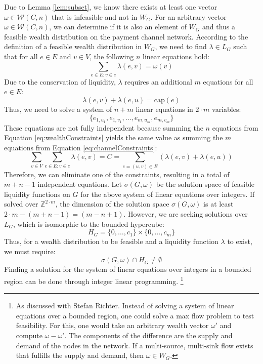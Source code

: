 \documentclass[10pt,twocolumn]{article}
\begin{document}
Due to Lemma \ref{lem:subset}, we know there exists at least one vector \( \omega \in \mathcal{W}(C,n) \) that is infeasible and not in \( W_G \).  
For an arbitrary vector \( \omega \in \mathcal{W}(C,n) \), we can determine if it is also an element of \( W_G \) and thus a feasible wealth distribution on the payment channel network.  
According to the definition of a feasible wealth distribution in \( W_G \), we need to find \( \lambda \in L_G \) such that for all \( e \in E \) and \( v \in V \), the following \( n \) linear equations hold:  
\begin{equation}
  \label{eq:wealthConstraints}
  \sum_{e \in E: v \in e}\lambda(e,v) = \omega(v)
\end{equation}
Due to the conservation of liquidity, \( \lambda \) requires an additional \( m \) equations for all \( e \in E \):  
\begin{equation}
  \label{eq:channelConstraints}
  \lambda(e,v) + \lambda(e,u) = \text{cap}(e)
\end{equation}
Thus, we need to solve a system of \( n + m \) linear equations in \( 2 \cdot m \) variables:  
\[ \{e_{1,{u_1}}, e_{1,v_1}, \dots, e_{m,u_m}, e_{m,v_m} \} \]  
These equations are not fully independent because summing the \( n \) equations from Equation \ref{eq:wealthConstraints} yields the same value as summing the \( m \) equations from Equation \ref{eq:channelConstraints}:  
\[ \sum_{v \in V}\sum_{e \in E: v \in e}\lambda(e,v) = C = \sum_{e=(u,v) \in E}\left(\lambda(e,v) + \lambda(e,u)\right) \]  
Therefore, we can eliminate one of the constraints, resulting in a total of \( m + n - 1 \) independent equations.  
Let \( \sigma(G,\omega) \) be the solution space of feasible liquidity functions on \( G \) for the above system of linear equations over integers.  
If solved over \( \mathbb{Z}^{2 \cdot m} \), the dimension of the solution space \( \sigma(G,\omega) \) is at least \( 2 \cdot m - (m + n - 1) = (m - n + 1) \). 
However, we are seeking solutions over \( L_G \), which is isomorphic to the bounded hypercube:  
\[ H_G = \{0, \dots, c_1\} \times \{0, \dots, c_m\} \]  
Thus, for a wealth distribution to be feasible and a liquidity function \( \lambda \) to exist, we must require:  
\begin{equation}
  \sigma(G,\omega) \cap H_G \neq \emptyset
\end{equation}
Finding a solution for the system of linear equations over integers in a bounded region can be done through integer linear programming.  
\footnote{As discussed with Stefan Richter. Instead of solving a system of linear equations over a bounded region, one could solve a max flow problem to test feasibility. For this, one would take an arbitrary wealth vector \( \omega' \) and compute \( \omega - \omega' \). The components of the difference are the supply and demand of the nodes in the network. If a multi-source, multi-sink flow exists that fulfills the supply and demand, then \( \omega \in W_G \).}
\end{document}
